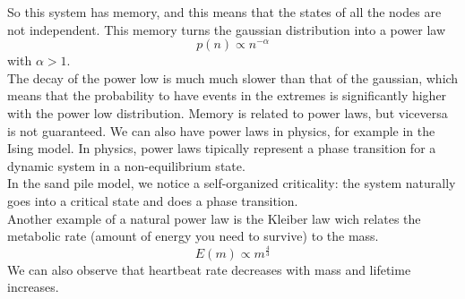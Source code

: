 So this system has memory, and this means that the states of all the nodes are not independent. This memory turns the gaussian distribution into a power law
$$
	p(n) \propto n^{-\alpha}
$$
with $\alpha > 1$. \\
The decay of the power low is much much slower than that of the gaussian, which means that the probability to have events in the extremes is significantly higher with the power low distribution.
Memory is related to power laws, but viceversa is not guaranteed.
We can also have power laws in physics, for example in the Ising model.
In physics, power laws tipically represent a phase transition for a dynamic system in a non-equilibrium state. \\
In the sand pile model, we notice a self-organized criticality: the system naturally goes into a critical state and does a phase transition. \\
Another example of a natural power law is the Kleiber law wich relates the metabolic rate (amount of energy you need to survive) to the mass.
\begin{equation}
	E(m) \propto m^{\frac{4}{3}}
\end{equation}
We can also observe that heartbeat rate decreases with mass and lifetime increases.
